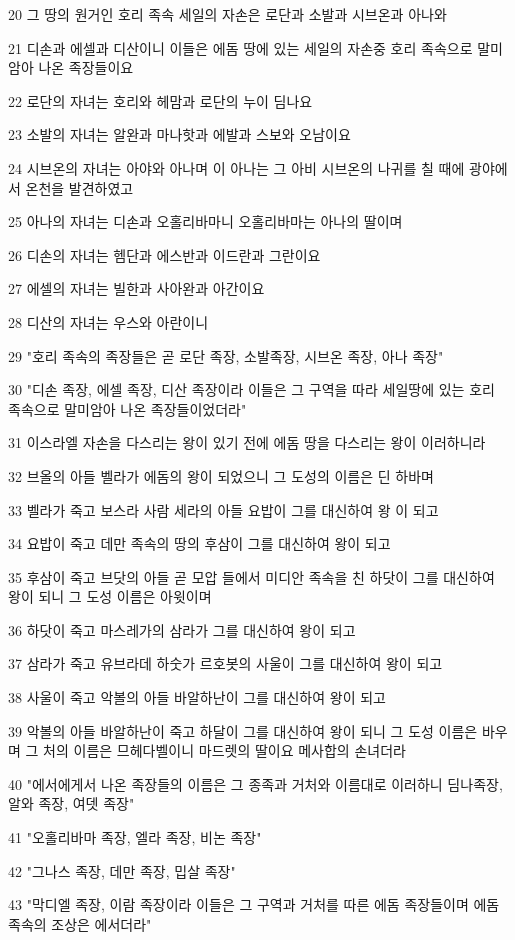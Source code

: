 \par 20 그 땅의 원거인 호리 족속 세일의 자손은 로단과 소발과 시브온과 아나와
\par 21 디손과 에셀과 디산이니 이들은 에돔 땅에 있는 세일의 자손중 호리 족속으로 말미암아 나온 족장들이요
\par 22 로단의 자녀는 호리와 헤맘과 로단의 누이 딤나요
\par 23 소발의 자녀는 알완과 마나핫과 에발과 스보와 오남이요
\par 24 시브온의 자녀는 아야와 아나며 이 아나는 그 아비 시브온의 나귀를 칠 때에 광야에서 온천을 발견하였고
\par 25 아나의 자녀는 디손과 오홀리바마니 오홀리바마는 아나의 딸이며
\par 26 디손의 자녀는 헴단과 에스반과 이드란과 그란이요
\par 27 에셀의 자녀는 빌한과 사아완과 아간이요
\par 28 디산의 자녀는 우스와 아란이니
\par 29 "호리 족속의 족장들은 곧 로단 족장, 소발족장, 시브온 족장, 아나 족장"
\par 30 "디손 족장, 에셀 족장, 디산 족장이라 이들은 그 구역을 따라 세일땅에 있는 호리 족속으로 말미암아 나온 족장들이었더라"
\par 31 이스라엘 자손을 다스리는 왕이 있기 전에 에돔 땅을 다스리는 왕이 이러하니라
\par 32 브올의 아들 벨라가 에돔의 왕이 되었으니 그 도성의 이름은 딘 하바며
\par 33 벨라가 죽고 보스라 사람 세라의 아들 요밥이 그를 대신하여 왕 이 되고
\par 34 요밥이 죽고 데만 족속의 땅의 후삼이 그를 대신하여 왕이 되고
\par 35 후삼이 죽고 브닷의 아들 곧 모압 들에서 미디안 족속을 친 하닷이 그를 대신하여 왕이 되니 그 도성 이름은 아윗이며
\par 36 하닷이 죽고 마스레가의 삼라가 그를 대신하여 왕이 되고
\par 37 삼라가 죽고 유브라데 하숫가 르호봇의 사울이 그를 대신하여 왕이 되고
\par 38 사울이 죽고 악볼의 아들 바알하난이 그를 대신하여 왕이 되고
\par 39 악볼의 아들 바알하난이 죽고 하달이 그를 대신하여 왕이 되니 그 도성 이름은 바우며 그 처의 이름은 므헤다벨이니 마드렛의 딸이요 메사합의 손녀더라
\par 40 "에서에게서 나온 족장들의 이름은 그 종족과 거처와 이름대로 이러하니 딤나족장, 알와 족장, 여뎃 족장"
\par 41 "오홀리바마 족장, 엘라 족장, 비논 족장"
\par 42 "그나스 족장, 데만 족장, 밉살 족장"
\par 43 "막디엘 족장, 이람 족장이라 이들은 그 구역과 거처를 따른 에돔 족장들이며 에돔 족속의 조상은 에서더라"

